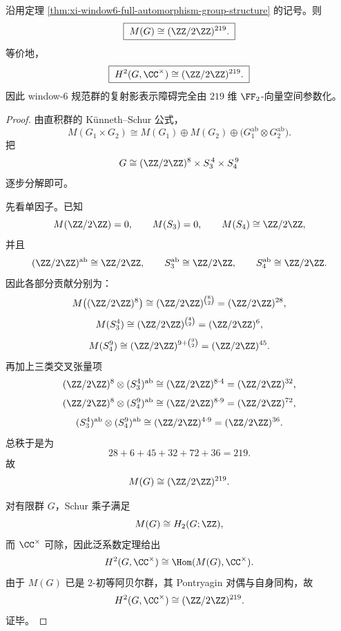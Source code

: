 \begin{theorem}\label{thm:xi-window6-schur-multiplier-219}
沿用定理 \ref{thm:xi-window6-full-automorphism-group-structure} 的记号。则
\[
\boxed{\;
M(G)\cong (\ZZ/2\ZZ)^{219}.\;}
\]
等价地，
\[
\boxed{\;
H^2(G,\CC^\times)\cong (\ZZ/2\ZZ)^{219}.\;}
\]
因此 window-\(6\) 规范群的复射影表示障碍完全由 \(219\) 维 \(\FF_2\)-向量空间参数化。
\end{theorem}
\begin{proof}
由直积群的 K\"unneth--Schur 公式，
\[
M(G_1\times G_2)
\cong
M(G_1)\oplus M(G_2)\oplus \bigl(G_1^{\mathrm{ab}}\otimes G_2^{\mathrm{ab}}\bigr).
\]
把
\[
G\cong (\ZZ/2\ZZ)^8\times S_3^{\,4}\times S_4^{\,9}
\]
逐步分解即可。

先看单因子。已知
\[
M(\ZZ/2\ZZ)=0,
\qquad
M(S_3)=0,
\qquad
M(S_4)\cong \ZZ/2\ZZ,
\]
并且
\[
(\ZZ/2\ZZ)^{\mathrm{ab}}\cong \ZZ/2\ZZ,
\qquad
S_3^{\mathrm{ab}}\cong \ZZ/2\ZZ,
\qquad
S_4^{\mathrm{ab}}\cong \ZZ/2\ZZ.
\]
因此各部分贡献分别为：
\[
M\bigl((\ZZ/2\ZZ)^8\bigr)\cong (\ZZ/2\ZZ)^{\binom82}=(\ZZ/2\ZZ)^{28},
\]
\[
M(S_3^4)\cong (\ZZ/2\ZZ)^{\binom42}=(\ZZ/2\ZZ)^6,
\]
\[
M(S_4^9)\cong (\ZZ/2\ZZ)^{9+\binom92}=(\ZZ/2\ZZ)^{45}.
\]
再加上三类交叉张量项
\[
(\ZZ/2\ZZ)^8\otimes (S_3^4)^{\mathrm{ab}}\cong (\ZZ/2\ZZ)^{8\cdot 4}=(\ZZ/2\ZZ)^{32},
\]
\[
(\ZZ/2\ZZ)^8\otimes (S_4^9)^{\mathrm{ab}}\cong (\ZZ/2\ZZ)^{8\cdot 9}=(\ZZ/2\ZZ)^{72},
\]
\[
(S_3^4)^{\mathrm{ab}}\otimes (S_4^9)^{\mathrm{ab}}\cong (\ZZ/2\ZZ)^{4\cdot 9}=(\ZZ/2\ZZ)^{36}.
\]
总秩于是为
\[
28+6+45+32+72+36=219.
\]
故
\[
M(G)\cong (\ZZ/2\ZZ)^{219}.
\]

对有限群 \(G\)，Schur 乘子满足
\[
M(G)\cong H_2(G;\ZZ),
\]
而 \(\CC^\times\) 可除，因此泛系数定理给出
\[
H^2(G,\CC^\times)\cong \Hom(M(G),\CC^\times).
\]
由于 \(M(G)\) 已是 \(2\)-初等阿贝尔群，其 Pontryagin 对偶与自身同构，故
\[
H^2(G,\CC^\times)\cong (\ZZ/2\ZZ)^{219}.
\]
证毕。
\end{proof}

